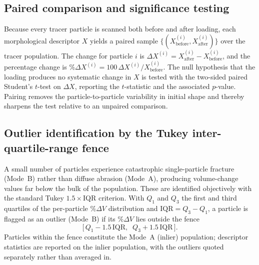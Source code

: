 \subsection{Paired comparison and significance testing}
\label{sec:paired-test}

Because every tracer particle is scanned both before and after loading, each morphological descriptor $X$ yields a paired sample $\{(X_{\mathrm{before}}^{(i)}, X_{\mathrm{after}}^{(i)})\}$ over the tracer population. The change for particle $i$ is $\Delta X^{(i)} = X_{\mathrm{after}}^{(i)} - X_{\mathrm{before}}^{(i)}$, and the percentage change is $\%\Delta X^{(i)} = 100\,\Delta X^{(i)}/X_{\mathrm{before}}^{(i)}$. The null hypothesis that the loading produces no systematic change in $X$ is tested with the two-sided paired Student's $t$-test on $\Delta X$, reporting the $t$-statistic and the associated $p$-value. Pairing removes the particle-to-particle variability in initial shape and thereby sharpens the test relative to an unpaired comparison.

\subsection{Outlier identification by the Tukey inter-quartile-range fence}
\label{sec:tukey}

A small number of particles experience catastrophic single-particle fracture (Mode~B) rather than diffuse abrasion (Mode~A), producing volume-change values far below the bulk of the population. These are identified objectively with the standard Tukey $1.5\times$IQR criterion. With $Q_1$ and $Q_3$ the first and third quartiles of the per-particle $\%\Delta V$ distribution and $\mathrm{IQR} = Q_3 - Q_1$, a particle is flagged as an outlier (Mode~B) if its $\%\Delta V$ lies outside the fence
\begin{equation}
  \bigl[\, Q_1 - 1.5\,\mathrm{IQR}, \;\; Q_3 + 1.5\,\mathrm{IQR} \,\bigr].
  \label{eq:tukey}
\end{equation}
Particles within the fence constitute the Mode~A (inlier) population; descriptor statistics are reported on the inlier population, with the outliers quoted separately rather than averaged in.
